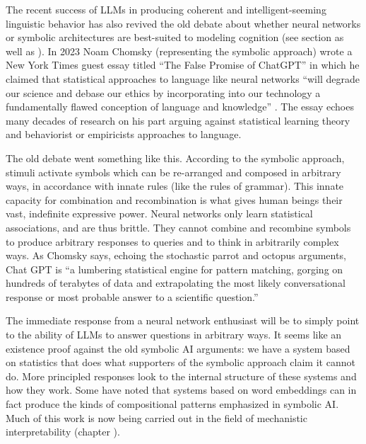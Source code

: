 The recent success of LLMs in producing coherent and intelligent-seeming linguistic behavior has also revived the old debate about whether neural networks or symbolic architectures are best-suited to modeling cognition (see section  as well as \cite{king2024large}). In 2023 Noam Chomsky (representing the symbolic approach) wrote a New York Times guest essay titled ``The False Promise of ChatGPT'' in which he claimed that statistical approaches to language like neural networks ``will degrade our science and debase our ethics by incorporating into our technology a fundamentally flawed conception of language and knowledge'' \cite{chomsky2023noam}. The essay echoes many decades of research on his part arguing against statistical learning theory and behaviorist or empiricists approaches to language. 

The old debate went something like this. According to the symbolic approach, stimuli activate symbols which can be re-arranged and composed in arbitrary ways, in accordance with innate rules (like the rules of grammar). This innate capacity for combination and recombination is what gives human beings their vast, indefinite expressive power. Neural networks only learn statistical associations, and are thus brittle. They cannot combine and recombine symbols to produce arbitrary responses to queries and to think in arbitrarily complex ways. As Chomsky says, echoing the stochastic parrot and octopus arguments, Chat GPT is ``a lumbering statistical engine for pattern matching, gorging on hundreds of terabytes of data and extrapolating the most likely conversational response or most probable answer to a scientific question.''

The immediate response from a neural network enthusiast will be to simply point to the ability of LLMs to answer questions in arbitrary ways. It seems like an existence proof against the old symbolic AI arguments: we have a system based on statistics that does what supporters of the symbolic approach claim it cannot do. More principled responses look to the internal structure of these systems and how they work. Some have noted that systems based on word embeddings can in fact produce the kinds of compositional patterns emphasized in symbolic AI. Much of this work is now being carried out in the field of mechanistic interpretability (chapter ). 

